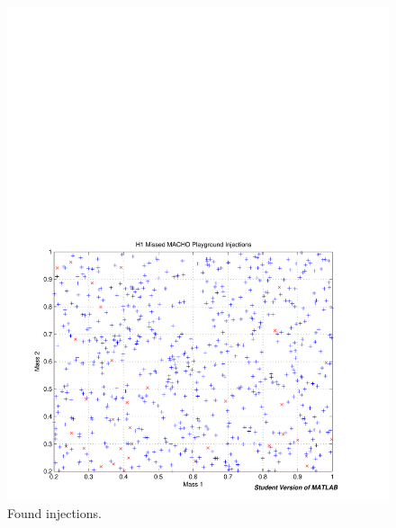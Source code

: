 \begin{figure}[p]
\begin{center}
\includegraphics[width=\textwidth]{analysis/figures/m1m2_found_missed}
\end{center}
\caption{\label{f:msun_eff}%
Found injections.
}
\end{figure}

